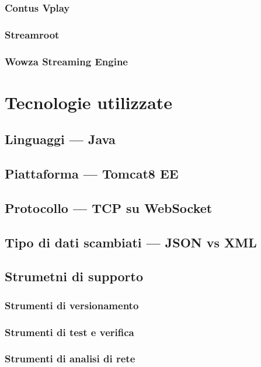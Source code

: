       \subsubsection{Contus Vplay}
      \subsubsection{Streamroot}
      \subsubsection{Wowza Streaming Engine}

\section{Tecnologie utilizzate}
   \subsection{Linguaggi --- Java}
   
   \subsection{Piattaforma --- Tomcat8 EE}

   \subsection{Protocollo --- TCP su WebSocket}

   \subsection{Tipo di dati scambiati --- JSON vs XML}
   \subsection{Strumetni di supporto}
      \subsubsection{Strumenti di versionamento}
      \subsubsection{Strumenti di test e verifica}
      \subsubsection{Strumenti di analisi di rete}
